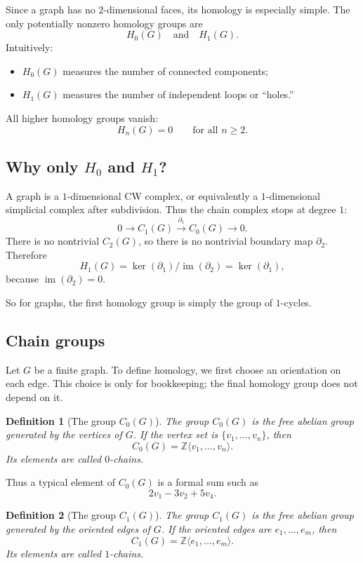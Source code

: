 \documentclass[12pt,a4paper]{article}
\newtheorem{definition}{Definition}[section]
\theoremstyle{notespace}
\begin{document}
	Since a graph has no \(2\)-dimensional faces, its homology is especially simple. The only potentially nonzero homology groups are
	\[
	H_0(G) \quad \text{and} \quad H_1(G).
	\]
	Intuitively:
	\begin{itemize}[leftmargin=2em]
		\item \(H_0(G)\) measures the number of connected components;
		\item \(H_1(G)\) measures the number of independent loops or ``holes.''
	\end{itemize}
	
	All higher homology groups vanish:
	\[
	H_n(G)=0 \qquad \text{for all } n\ge 2.
	\]
	
	\subsection{Why only \(H_0\) and \(H_1\)?}
	
	A graph is a \(1\)-dimensional CW complex, or equivalently a \(1\)-dimensional simplicial complex after subdivision. Thus the chain complex stops at degree \(1\):
	\[
	0 \longrightarrow C_1(G) \xrightarrow{\partial_1} C_0(G) \longrightarrow 0.
	\]
	There is no nontrivial \(C_2(G)\), so there is no nontrivial boundary map \(\partial_2\). Therefore
	\[
	H_1(G)=\ker(\partial_1)/\operatorname{im}(\partial_2)=\ker(\partial_1),
	\]
	because \(\operatorname{im}(\partial_2)=0\).
	
	So for graphs, the first homology group is simply the group of \(1\)-cycles.
	
	\subsection{Chain groups}
	
	Let \(G\) be a finite graph. To define homology, we first choose an orientation on each edge. This choice is only for bookkeeping; the final homology group does not depend on it.
	
	\begin{definition}[The group \(C_0(G)\)]
		The group \(C_0(G)\) is the free abelian group generated by the vertices of \(G\).
		If the vertex set is \(\{v_1,\dots,v_n\}\), then
		\[
		C_0(G)=\mathbb{Z}\langle v_1,\dots,v_n\rangle.
		\]
		Its elements are called \emph{\(0\)-chains}.
	\end{definition}
	
	Thus a typical element of \(C_0(G)\) is a formal sum such as
	\[
	2v_1-3v_2+5v_4.
	\]
	
	\begin{definition}[The group \(C_1(G)\)]
		The group \(C_1(G)\) is the free abelian group generated by the oriented edges of \(G\).
		If the oriented edges are \(e_1,\dots,e_m\), then
		\[
		C_1(G)=\mathbb{Z}\langle e_1,\dots,e_m\rangle.
		\]
		Its elements are called \emph{\(1\)-chains}.
	\end{definition}
	
\end{document}
